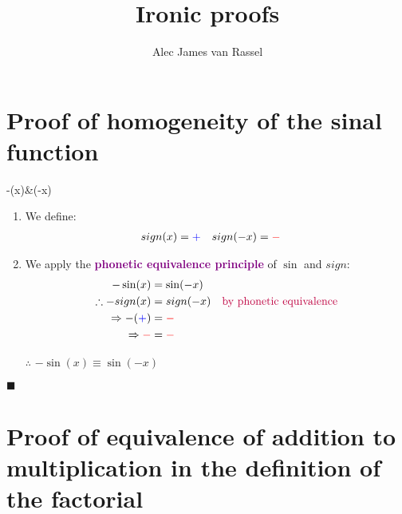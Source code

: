 \documentclass[12pt, titlepage,french]{article}
\begin{document}
\title{Ironic proofs}
\vspace{-8ex}
\date{}
\author{Alec James van Rassel}
\maketitle

\tableofcontents
\setcounter{secnumdepth}{-1}

\clearpage



\section{Proof of homogeneity of the sinal function}

\begin{theorems}[Theorem]
	-\sin(x)&\equiv	\sin(-x) 
\end{theorems}

\begin{distributions}[Proof]
\begin{enumerate}
	\item	We define:
		\begin{align*}
		sign(x)	&=	\textcolor{blue}{+}	&
		sign(-x)	&=	\textcolor{red}{-}
		\end{align*}
	\item	We apply the \textcolor{purple}{\textbf{phonetic equivalence principle}} of $\sin$ and $sign$:
		\begin{align*}
						-\sin(x)					&=	\sin(-x)	\\		
		\therefore	-sign(x)					&=	sign(-x)		\quad	\text{\textcolor{purple}{by phonetic equivalence}}\\		
		\Rightarrow	-(\textcolor{blue}{+})	&=	\textcolor{red}{-}	\\		
		\Rightarrow	\textcolor{red}{-}		&=	\textcolor{red}{-}	
		\end{align*}		
	\item[$\therefore$]	$-\sin(x)\equiv	\sin(-x)$
\end{enumerate}
\end{distributions}
$\blacksquare$

\clearpage

\section{Proof of equivalence of addition to multiplication in the definition of the factorial}
\end{document}
